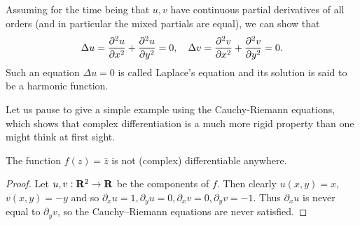 Assuming for the time being that $u,v$ have continuous partial derivatives of all orders (and in particular the mixed partials are equal), we can show that
\[\Delta u=\pdv[2]{u}{x}+\pdv[2]{u}{y}=0,\quad\Delta v=\pdv[2]{v}{x}+\pdv[2]{v}{y}=0.\]
Such an equation $\Delta u=0$ is called Laplace's equation and its solution is said to be a harmonic function.

Let us pause to give a simple example using the Cauchy-Riemann equations, which shows that complex differentiation is a much more rigid property than one might think at first sight.

\begin{example}
The function $f(z)=\bar{z}$ is not (complex) differentiable anywhere.
\end{example}

\begin{proof}
Let $u,v:\mathbf R^2\to\mathbf R$ be the components of $f$. Then clearly $u(x,y) = x$, $v(x,y)=-y$ and so $\partial_x u=1,\partial_y u=0, \partial_x v=0, \partial_y v=-1$. Thus $\partial_xu$ is never equal to $\partial_yv$, so the Cauchy--Riemann equations are never satisfied.
\end{proof}

